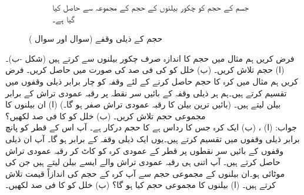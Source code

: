 \begin{figure}
\begin{subfigure}{0.45\textwidth}
\caption{جسم کے حجم کو  چکور بیلنوں کے حجم کے مجموعہ سے حاصل کیا گیا ہے۔}
\end{subfigure}
\caption{حجم کے ذیلی وقفے (سوال  اور سوال )}
\label{شکل_سوال_تکمل_حجم_دو_ٹکڑے}
\end{figure}
فرض کریں ہم مثال  میں حجم کا اندازہ صرف  چکور بیلنوں سے کرتے ہیں (شکل -ب)۔ (ا) حجم  تلاش کریں۔ (ب) خلل  کو  کی فی صد کی صورت میں حاصل کریں۔  
فرض کریں ہم مثال  میں کرہ کا حجم حاصل کرنے کے لئے وقفہ  کو چار برابر ذیلی وقفوں میں تقسیم کرتے ہیں۔ہم ہر ذیلی وقفہ  کے بائیں سر نقطہ پر رقبہ عمودی تراش کے برابر بیلن لیتے ہیں۔ (بائیں ترین بیلن کا رقبہ عمودی تراش صفر ہو گا۔) (ا) ان بیلنوں کا مجموعی حجم  تلاش کریں۔ (ب) خلل  کو  کا فی صد لکھیں؟\\
جواب:\quad
(ا) ، (ب) 
ایک کرہ جس کا رداس  ہے کا حجم درکار ہے۔ آپ اس کے قطر کو پانچ برابر ذیلی وقفوں میں تقسیم کرتے ہیں۔یوں ایک ذیلی وقفہ  کے برابر ہو گا۔ آپ ان ذیلی وقفوں  کے بائیں سر نقطوں پر قطر کے عمودی  کرہ کو کاٹ کر رقبہ عمودی تراش حاصل کرتے ہیں۔ آپ اتنی ہی رقبہ عمودی تراش والے ایسے بیلن لیتے ہیں جن کی موٹائی  ہو۔ان بیلنوں کے مجموعی حجم سے آپ کرہ کے حجم کی اندازاً قیمت تلاش کرتے ہیں۔ (ا) بیلنوں کا مجموعی حجم  کیا ہو گا؟ (ب)  خلل  کو  کا فی صد لکھیں۔

